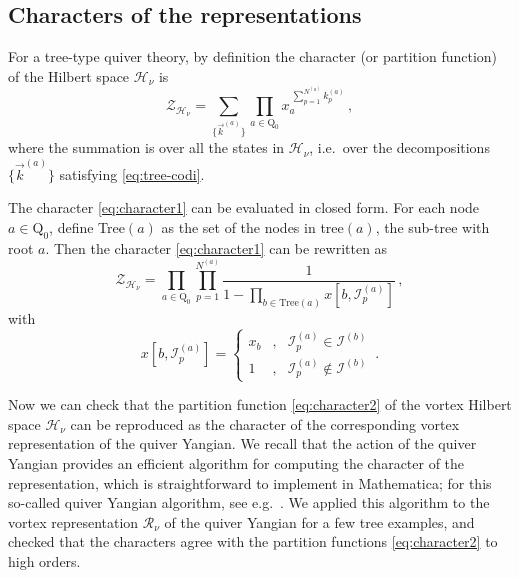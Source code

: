 \documentclass[12pt,a4paper]{article}
\renewcommand{\(}{\left(}
\renewcommand{\)}{\right)}
\renewcommand{\(}{\left(}
\renewcommand{\)}{\right)}
\begin{document}
\subsection{Characters of the representations}


For a tree-type quiver theory, by definition the character (or partition function) of the Hilbert space $\mathcal{H}_\nu$ is 
\begin{equation}\label{eq:character1}
\mathcal{Z}_{\mathcal{H}_\nu}=\sum_{\{\vec{k}^{(a)}\}}\prod_{a\in \mathrm{Q}_0}x_a^{\ \sum_{p=1}^{N^{(a)}}k^{(a)}_p}\,,
\end{equation} 
where the summation is over all the states in $\mathcal{H}_{\nu}$, i.e.\ over the decompositions $\{\vec{k}^{(a)}\}$ satisfying \eqref{eq:tree-codi}. 

The character \eqref{eq:character1} can be evaluated in closed form. 
For each node $a\in \mathrm{Q}_0$, define Tree$(a)$ as the set of the nodes in tree$(a)$, the sub-tree with root $a$.
Then the character \eqref{eq:character1} can be rewritten as
\begin{equation}\label{eq:character2}
\mathcal{Z}_{\mathcal{H}_{\nu}}=\prod_{a\in \mathrm{Q}_0}\prod_{p=1}^{N^{(a)}}\frac{1}{1-\prod_{b\in \textrm{Tree}(a)}x[b,\mathcal{I}^{(a)}_p]}\,,
\end{equation}
with
\begin{equation}
x[b,\mathcal{I}^{(a)}_p]=\left\{ 
\begin{array}{lll}
x_b&  , & \mathcal{I}^{(a)}_p \in \mathcal{I}^{(b)} \\
1&  , &  \mathcal{I}^{(a)}_p \notin \mathcal{I}^{(b)}
\end{array}
\right.\,.
\end{equation}

\medskip

Now we can check that the partition function \eqref{eq:character2} of the vortex Hilbert space $\mathcal{H}_{\nu}$ can be reproduced as the character of the corresponding vortex representation of the quiver Yangian.
We recall that the action of the quiver Yangian provides an efficient algorithm for computing the character of the representation, which is straightforward to implement in Mathematica; for this so-called quiver Yangian algorithm, see e.g.\ \cite[Sec.~3.2]{Li:2023zub}.
We applied this algorithm to the vortex representation $\mathcal{R}_\nu$ of the quiver Yangian for a few tree examples, and checked that the characters agree with the partition functions \eqref{eq:character2} to high orders.
\end{document}
